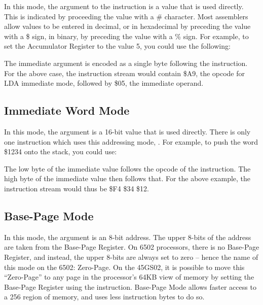 In this mode, the argument to the instruction is a value that is used directly.
This is indicated by proceeding the value with a \# character. Most assemblers allow
values to be entered in decimal, or in hexadecimal by preceding the value with a \$ sign,
in binary, by preceding the value with a \% sign.  For example, to set the Accumulator
Register to the value 5, you could use the following:


The immediate argument is encoded as a single byte following the instruction.  For the above
case, the instruction stream would contain \$A9, the opcode for LDA immediate mode, followed
by \$05, the immediate operand.

\subsection{Immediate Word Mode}

In this mode, the argument is a 16-bit value that is used directly. There is only one instruction
which uses this addressing mode, .  For example, to push the word \$1234
onto the stack, you could use:


The low byte of the immediate value follows the opcode of the instruction.  The high byte of the
immediate value then follows that.  For the above example, the instruction stream would thus
be \$F4 \$34 \$12.

\subsection{Base-Page Mode}
\label{Base-Page (Zero-Page) Mode}

In this mode, the argument is an 8-bit address.  The upper 8-bits of the address are taken from
the Base-Page Register.  On 6502 processors, there is no Base-Page Register, and instead, the
upper 8-bits are always set to zero -- hence the name of this mode on the 6502: Zero-Page. On
the 45GS02, it is possible to move this ``Zero-Page'' to any page in the processor's 64KB view
of memory by setting the Base-Page Register using the  instruction. Base-Page
Mode allows faster access to a 256 region of memory, and uses less instruction bytes to do so.

